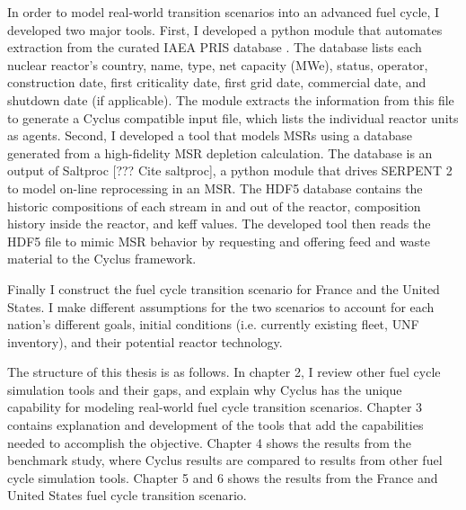In order to model real-world transition scenarios into an advanced
fuel cycle, I developed two major tools. First, I developed a python
module that automates extraction from the curated \gls{IAEA} \gls{PRIS} database
\cite{iaea_nuclear_2018}. The database lists each nuclear reactor's
country, name, type, net capacity (\gls{MWe}), status, operator, construction
date, first criticality date, first grid date, commercial date, and shutdown
date (if applicable). The module extracts the information from this file
to generate a Cyclus compatible input file, which lists the individual
reactor units as agents. Second, I developed a tool that models \glspl{MSR}
using a database generated from a high-fidelity \gls{MSR} depletion calculation.
The database is an output of Saltproc [??? Cite saltproc], a python
module that drives
SERPENT 2 \cite{leppanen_serpentcontinuous-energy_2013} to model on-line reprocessing in an \gls{MSR}.
The HDF5 database contains the historic compositions of each stream in and out of the reactor,
composition history inside the reactor, and keff values. The developed tool then
reads the HDF5 file to mimic \gls{MSR} behavior by requesting and offering
feed and waste material to the Cyclus framework.

Finally I construct the fuel cycle transition scenario for France and the United States.
I make different assumptions for the two scenarios to account for each nation's different goals,
initial conditions (i.e. currently existing fleet, \gls{UNF} inventory), and their potential reactor
technology.

The structure of this thesis is as follows. In chapter 2, I review other fuel cycle simulation
tools and their gaps, and explain why Cyclus
has the unique capability for modeling real-world fuel cycle transition scenarios.
Chapter 3 contains explanation and development of the tools that add the 
capabilities needed to accomplish the objective.
Chapter 4 shows the results from the benchmark study, where Cyclus results are compared
to results from other fuel cycle simulation tools.
Chapter 5 and 6 shows the results from the France and United States fuel cycle transition
scenario.

